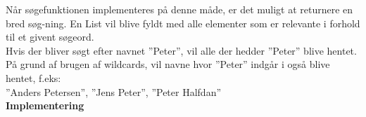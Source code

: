 Når søgefunktionen implementeres på denne måde, er det muligt at returnere en bred søg-ning. En List vil blive fyldt med alle elementer som er relevante i forhold til et givent søgeord.\\
Hvis der bliver søgt efter navnet ”Peter”, vil alle der hedder ”Peter” blive hentet. På grund af brugen af wildcards, vil navne hvor ”Peter” indgår i også blive hentet, f.eks:\\
”Anders Petersen”, ”Jens Peter”, ”Peter Halfdan”\\
\textbf{Implementering}\\
